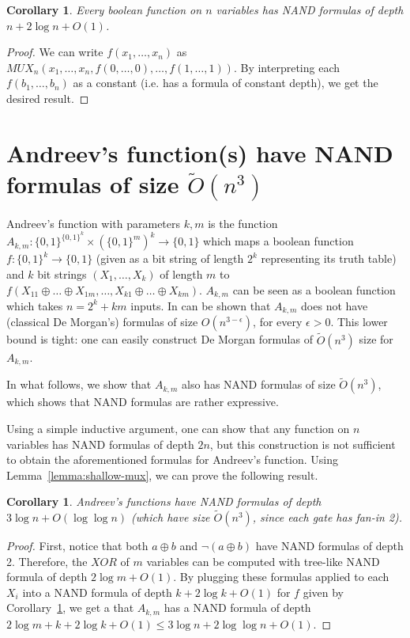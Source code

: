 \documentclass{article}
\newcommand{\Ot}{\tilde{O}}%
\newcommand{\bit}{\{0,1\}}%
\theoremstyle{plain}
\newtheorem{corollary}[theorem]{Corollary}
\theoremstyle{definition}
\begin{document}
\begin{corollary}\label{cor:shallow-nand}
	Every boolean function on $n$ variables has NAND formulas of depth $n + 2\log n + O(1)$.
\end{corollary}
\begin{proof}
	We can write $f(x_1,\ldots,x_n)$ as $MUX_{n}(x_1,\ldots, x_n, f(0,\ldots,0),\ldots,f(1,\ldots,1))$.
	By interpreting each $f(b_1,\ldots,b_n)$ as a constant (i.e. has a formula of constant depth), we get the desired result.
\end{proof}

\section{Andreev's function(s) have NAND formulas of size $\Ot(n^3)$}

Andreev's function with parameters $k, m$
is the function $A_{k,m} : \bit^{\bit^k} \times (\bit^m)^k \rightarrow \bit$
which maps a boolean function $f: {\bit^k} \rightarrow \bit$ 
(given as a bit string of length $2^k$ representing its truth table)
and $k$ bit strings $(X_1,\ldots, X_k)$ of length $m$
to $f(X_{11} \oplus \ldots \oplus X_{1m}, \ldots, X_{k1} \oplus \ldots \oplus X_{km})$.
$A_{k,m}$ can be seen as a boolean function which takes $n = 2^k + km$ inputs.
In can be shown that $A_{k,m}$ does not have (classical De Morgan's) formulas
of size $O(n^{3-\epsilon})$, for every $\epsilon > 0$.
This lower bound is tight: one can easily construct De Morgan formulas of $\Ot(n^3)$ size
for $A_{k,m}$.

In what follows, we show that $A_{k,m}$ also has NAND formulas of size $\Ot(n^3)$,
which shows that NAND formulas are rather expressive.

Using a simple inductive argument, one can show that any function on $n$ variables has 
NAND formulas of depth $2n$, but this construction is not sufficient to obtain the aforementioned 
formulas for Andreev's function.
Using Lemma~\ref{lemma:shallow-mux}, we can prove the following result.

\begin{corollary}
	Andreev's functions have NAND formulas of depth $3\log n + O(\log \log n)$
	(which have size $\Ot(n^3)$, since each gate has fan-in 2).
\end{corollary}
\begin{proof}
	First, notice that both $a\oplus b$ and $\neg (a\oplus b)$ have NAND formulas of depth 2.
	Therefore, the $XOR$ of $m$ variables can be computed with tree-like NAND formula of depth $2\log m + O(1)$.
	By plugging these formulas applied to each $X_i$ 
	into a NAND formula of depth $k + 2\log k + O(1)$ for $f$ given by Corollary~\ref{cor:shallow-nand},
	we get a that $A_{k,m}$ has a NAND formula of depth 
	$2\log m + k + 2\log k + O(1) \leq  3\log n + 2\log\log n + O(1)$.
\end{proof}
\end{document}
